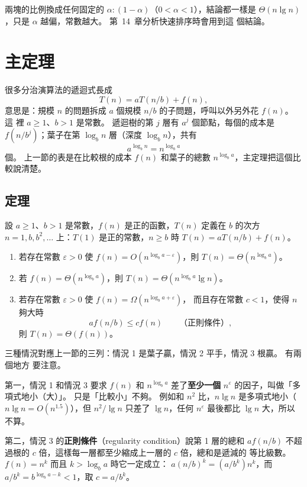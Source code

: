 兩塊的比例換成任何固定的 $\alpha : (1 - \alpha)$（$0 < \alpha < 1$），結論都一樣是
$\Theta(n \lg n)$，只是 $\alpha$ 越偏，常數越大。 第~14~章分析快速排序時會用到這
個結論。

\section{主定理}
\label{sec:rec-master}

很多分治演算法的遞迴式長成
\[
T(n) = aT(n/b) + f(n),
\]
意思是：規模 $n$ 的問題拆成 $a$ 個規模 $n/b$ 的子問題，呼叫以外另外花 $f(n)$。 這
裡 $a \ge 1$、$b > 1$ 是常數。 遞迴樹的第 $j$ 層有 $a^j$ 個節點，每個的成本是
$f(n/b^j)$；葉子在第 $\log_b n$ 層（深度 $\log_b n$），共有
\[
a^{\log_b n} = n^{\log_b a}
\]
個。 上一節的表是在比較根的成本 $f(n)$ 和葉子的總數 $n^{\log_b a}$，主定理把這個比
較說清楚。

\subsection{定理}

\begin{theorem}[主定理]
\label{thm:rec-master}
設 $a \ge 1$、$b > 1$ 是常數，$f(n)$ 是正的函數，$T(n)$ 定義在 $b$ 的次方
$n = 1, b, b^2, \ldots$ 上：$T(1)$ 是正的常數，$n \ge b$ 時
$T(n) = aT(n/b) + f(n)$。
\begin{enumerate}
\item 若存在常數 $\varepsilon > 0$ 使 $f(n) = O(n^{\log_b a - \varepsilon})$，則
$T(n) = \Theta(n^{\log_b a})$。
\item 若 $f(n) = \Theta(n^{\log_b a})$，則 $T(n) = \Theta(n^{\log_b a} \lg n)$。
\item 若存在常數 $\varepsilon > 0$ 使 $f(n) = \Omega(n^{\log_b a + \varepsilon})$，
而且存在常數 $c < 1$，使得 $n$ 夠大時
\[
a f(n/b) \le c f(n) \qquad \text{（正則條件）},
\]
則 $T(n) = \Theta(f(n))$。
\end{enumerate}
\end{theorem}

三種情況對應上一節的三列：情況 1 是葉子贏，情況 2 平手，情況 3 根贏。 有兩個地方
要注意。

第一，情況 1 和情況 3 要求 $f(n)$ 和 $n^{\log_b a}$ 差了\textbf{至少一個}
$n^{\varepsilon}$ 的因子，叫做「多項式地小（大）」。 只是「比較小」不夠。 例如和
$n^2$ 比，$n \lg n$ 是多項式地小（$n \lg n = O(n^{1.5})$），但 $n^2 / \lg n$ 只差了
$\lg n$，任何 $n^{\varepsilon}$ 最後都比 $\lg n$ 大，所以不算。

第二，情況 3 的\textbf{正則條件}（regularity condition）說第 1 層的總和
$a f(n/b)$ 不超過根的 $c$ 倍，這樣每一層都至少縮成上一層的 $c$ 倍，總和是遞減的
等比級數。 $f(n) = n^k$ 而且 $k > \log_b a$ 時它一定成立：
$a (n/b)^k = (a/b^k) n^k$，而 $a/b^k = b^{\log_b a - k} < 1$，取 $c = a/b^k$。


